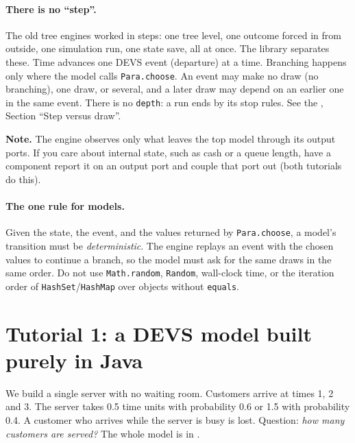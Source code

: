 \documentclass[11pt]{article}
\newcommand{\code}[1]{\texttt{#1}}
\newcommand{\note}[1]{\par\noindent\colorbox{notebg}{\parbox{\dimexpr\linewidth-2\fboxsep}{\small\textbf{Note.} #1}}\par}
\begin{document}
\paragraph{There is no ``step''.} The old tree engines worked in steps: one tree level, one outcome forced in from
outside, one simulation run, one state save, all at once. The library separates these. Time advances one DEVS event
(departure) at a time. Branching happens only where the model calls \code{Para.choose}. An event may make no draw (no
branching), one draw, or several, and a later draw may depend on an earlier one in the same event. There is no
\code{depth}: a run ends by its stop rules. See the , Section ``Step versus draw''.

\note{The engine observes only what leaves the top model through its output ports. If you care about internal
state, such as cash or a queue length, have a component report it on an output port and couple that port out (both
tutorials do this).}

\paragraph{The one rule for models.} Given the state, the event, and the values returned by \code{Para.choose}, a
model's transition must be \emph{deterministic}. The engine replays an event with the chosen values to continue
a branch, so the model must ask for the same draws in the same order. Do not use \code{Math.random}, \code{Random},
wall-clock time, or the iteration order of \code{HashSet}/\code{HashMap} over objects without \code{equals}.

\section{Tutorial 1: a DEVS model built purely in Java}
\label{sec:tutorial}

We build a single server with no waiting room. Customers arrive at times 1, 2 and 3. The server takes 0.5 time units
with probability 0.6 or 1.5 with probability 0.4. A customer who arrives while the server is busy is lost. Question:
\emph{how many customers are served?} The whole model is in .
\end{document}
